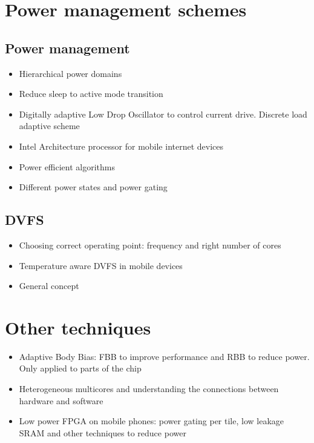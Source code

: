 \documentclass[journal]{IEEEtran}
\begin{document}
\section{Power management schemes}
\subsection{Power management}
\begin{itemize}
	\item Hierarchical power domains \cite{HierarchicalPower}
	\item Reduce sleep to active mode transition \cite{LDO}
	\item Digitally adaptive Low Drop Oscillator to control current drive. Discrete load adaptive scheme \cite{LDO}
	\item Intel Architecture processor for mobile internet devices \cite{Intel}
	\item Power efficient algorithms \cite{Intel}
	\item Different power states and power gating \cite{Intel} 
\end{itemize}

\subsection{DVFS}
\begin{itemize}
	\item Choosing correct operating point: frequency and right number of cores \cite{LinuxGov}
	\item Temperature aware DVFS in mobile devices \cite{TempDVFS}
	\item General concept \cite{AVR}
\end{itemize}

\section{Other techniques}
\begin{itemize}
	\item Adaptive Body Bias: FBB to improve performance and RBB to reduce power. Only applied to parts of the chip \cite{ABB}
	\item Heterogeneous multicores and understanding the connections between hardware and software \cite{HD/SF} \cite{MultiCores}
	\item Low power FPGA on mobile phones: power gating per tile, low leakage SRAM and other techniques to reduce power \cite{FPGA}
\end{itemize}
\end{document}
